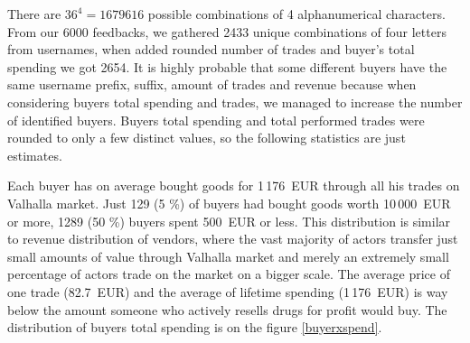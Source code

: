 \documentclass[
  digital, %
  table,   %
  lof,     %
  lot,     %
  oneside
]{fithesis3}
\begin{document}
There are $36^4=1679616$ possible combinations of 4 alphanumerical characters.
From our 6000 feedbacks, we gathered 2433 unique combinations of four letters from usernames,
when added rounded number of trades and buyer's total spending we got 2654.
It is highly probable that some different buyers have the same username prefix, suffix, amount of trades and revenue because when considering buyers total spending and trades, we managed to increase
the number of identified buyers. Buyers total spending and total performed trades were rounded to only a few distinct values, so the
following statistics are just estimates.

Each buyer has on average bought goods for 1\,176~EUR through all his trades on Valhalla market.
Just 129 (5 \%) of buyers had bought goods worth 10\,000~EUR or more,
 1289 (50 \%) buyers spent 500~EUR or less.
This distribution is similar to revenue distribution of vendors, where
the vast majority of actors transfer just small amounts of value through Valhalla market and
merely an extremely small percentage of actors trade on the market on a bigger scale.
The average price of one trade (82.7~EUR) and the average of lifetime spending (1\,176~EUR)
is way below the amount someone who actively resells drugs for profit would buy.
The distribution of buyers total spending is on the figure \ref{buyerxspend}.
\end{document}

